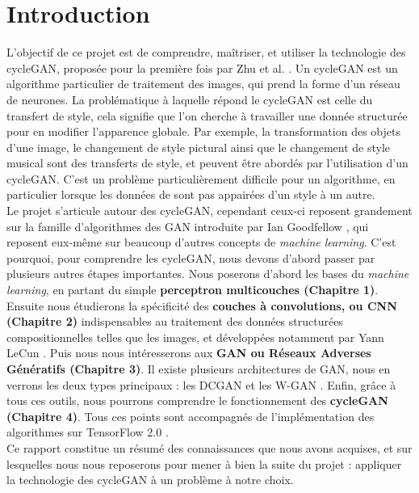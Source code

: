 \chapter*{Introduction}


L'objectif de ce projet est de comprendre, maîtriser, et utiliser la technologie des cycleGAN, proposée pour la première fois par Zhu et al. \cite{zhu_unpaired_2018}. Un cycleGAN est un algorithme particulier de traitement des images, qui prend la forme d'un réseau de neurones. La problématique à laquelle répond le cycleGAN est celle du transfert de style, cela signifie que l'on cherche à travailler une donnée structurée pour en modifier l’apparence globale. Par exemple, la transformation des objets d'une image, le changement de style pictural ainsi que le changement de style musical sont des transferts de style, et peuvent être abordés par l'utilisation d'un cycleGAN. C'est un problème particulièrement difficile pour un algorithme, en particulier lorsque les données de sont pas appairées d'un style à un autre.\\

Le projet s'articule autour des cycleGAN, cependant ceux-ci reposent grandement sur la famille d'algorithmes des GAN introduite par Ian Goodfellow \cite{goodfellow_generative_2014-1}, qui reposent eux-même sur beaucoup d'autres concepts de \textit{machine learning}. C'est pourquoi, pour comprendre les cycleGAN, nous devons d'abord passer par plusieurs autres étapes importantes. Nous poserons d'abord les bases du \textit{machine learning}, en partant du simple \textbf{perceptron multicouches (Chapitre 1)}. Ensuite nous étudierons la spécificité des \textbf{couches à convolutions, ou 
CNN (Chapitre 2)} indispensables au traitement des données structurées compositionnelles telles que les images, et développées notamment par Yann LeCun \cite{lecun_gradient-based_1998}. Puis nous nous intéresserons aux \textbf{GAN ou Réseaux Adverses Génératifs (Chapitre 3)}. Il existe plusieurs architectures de GAN, nous en verrons les deux types principaux : les DCGAN \cite{goodfellow_generative_2014} et les W-GAN \cite{arjovsky_wasserstein_2017}. Enfin, grâce à tous ces outils, nous pourrons comprendre le fonctionnement des \textbf{cycleGAN (Chapitre 4)}. Tous ces points sont accompagnés de l'implémentation des algorithmes sur TensorFlow 2.0 \cite{goldsborough_tour_2016}.\\

Ce rapport constitue un résumé des connaissances que nous avons acquises, et sur lesquelles nous nous reposerons pour mener à bien la suite du projet : appliquer la technologie des cycleGAN à un problème à notre choix.
